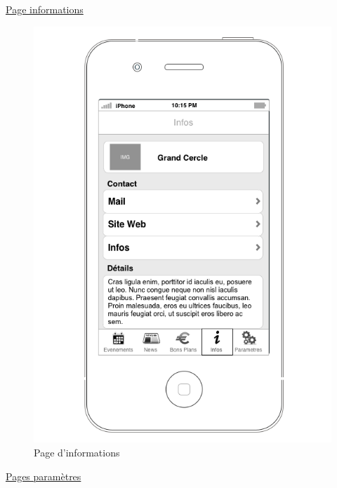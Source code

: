 \documentclass[a4paper, 11px]{article}
\begin{document}
\underline{Page informations}
\begin{figure}[h!]
	\begin{minipage}[c]{.50\linewidth}
		\begin{center}
			\includegraphics[scale=0.29]{../../Sketch/iOS/infos.png}
		\end{center}
	\caption{Page d'informations}
	\end{minipage}
\end{figure}

\clearpage
\underline{Pages paramètres}
\end{document}
